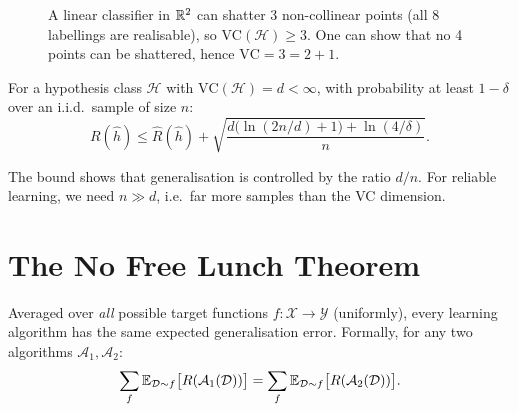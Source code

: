 \begin{figure}[ht]
\centering
{}
\caption{A linear classifier in $\mathbb{R}^2$ can shatter 3 non-collinear points (all 8 labellings are realisable), so $\text{VC}(\mathcal{H})\geq 3$. One can show that no 4 points can be shattered, hence $\text{VC}=3=2+1$.}
\label{fig:vc-shattering}
\end{figure}

\begin{theorem}
For a hypothesis class $\mathcal{H}$ with $\text{VC}(\mathcal{H})=d<\infty$, with probability at least $1-\delta$ over an i.i.d.\ sample of size $n$:
\[
  R(\hat h) \leq \hat R(\hat h) + \sqrt{\frac{d\bigl(\ln(2n/d)+1\bigr)+\ln(4/\delta)}{n}}.
\]
\end{theorem}

\begin{remark}
The bound shows that generalisation is controlled by the ratio $d/n$. For reliable learning, we need $n\gg d$, i.e.\ far more samples than the VC dimension.
\end{remark}

\section{The No Free Lunch Theorem}

\begin{theorem}
Averaged over \emph{all} possible target functions $f:\mathcal{X}\to\mathcal{Y}$ (uniformly), every learning algorithm has the same expected generalisation error. Formally, for any two algorithms $\mathcal{A}_1,\mathcal{A}_2$:
\[
  \sum_f \mathbb{E}_{\mathcal{D}\sim f}\bigl[R(\mathcal{A}_1(\mathcal{D}))\bigr]
  = \sum_f \mathbb{E}_{\mathcal{D}\sim f}\bigl[R(\mathcal{A}_2(\mathcal{D}))\bigr].
\]
\end{theorem}

